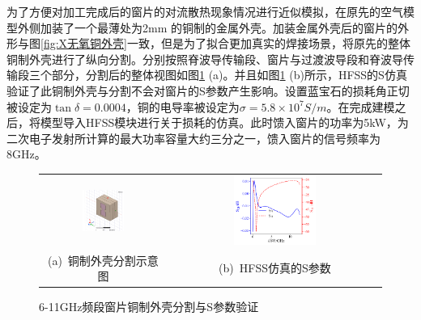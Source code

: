 \documentclass[master]{thesis-uestc}
\begin{document}
为了方便对加工完成后的窗片的对流散热现象情况进行近似模拟，在原先的空气模型外侧加装了一个最薄处为2mm 的铜制的金属外壳。加装金属外壳后的窗片的外形与图\ref{fig:X无氧铜外壳}一致，但是为了拟合更加真实的焊接场景，将原先的整体铜制外壳进行了纵向分割。分别按照脊波导传输段、窗片与过渡波导段和脊波导传输段三个部分，分割后的整体视图如图\ref{fig:X频段铜制外壳分割后} (a)。并且如图\ref{fig:X频段铜制外壳分割后} (b)所示，HFSS的S仿真验证了此铜制外壳与分割不会对窗片的S参数产生影响。设置蓝宝石的损耗角正切被设定为\(\tan \delta = 0.0004\)，铜的电导率被设定为\(\sigma = 5.8 \times 10^7 S/m\)。在完成建模之后，将模型导入HFSS模块进行关于损耗的仿真。此时馈入窗片的功率为5kW，为二次电子发射所计算的最大功率容量大约三分之一，馈入窗片的信号频率为8GHz。
\begin{figure}[!htb]
    \small
    \centering
    \begin{tabular}{@{\ }c@{\ }c}
        \includegraphics[width=0.35\textwidth]{pic/chapter3/铜制外壳分割后.png} & 
        \hspace{5pt}
        \includegraphics[width=0.4\textwidth]{pic/chapter3/分割后的S参数.png}     \\
        \mbox{\small (a) 铜制外壳分割示意图}                                                                               & 
        \mbox{\small (b) HFSS仿真的S参数}                                                                                  \\
    \end{tabular}
    \caption{6-11GHz频段窗片铜制外壳分割与S参数验证}
    \label{fig:X频段铜制外壳分割后}
\end{figure}
\end{document}
